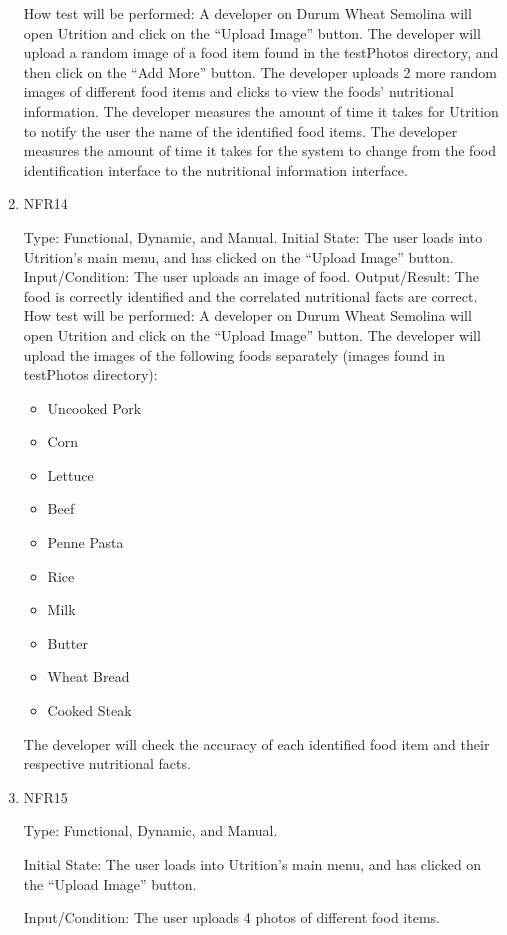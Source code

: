 \documentclass[12pt, titlepage]{article}
\begin{document}
\begin{enumerate}
How test will be performed: A developer on Durum Wheat Semolina will open Utrition and click on the “Upload Image” button. The developer will upload a random image of a food item found in the testPhotos directory, and then click on the “Add More” button. The developer uploads 2 more random images of different food items and clicks to view the foods’ nutritional information. The developer measures the amount of time it takes for Utrition to notify the user the name of the identified food items. The developer measures the amount of time it takes for the system to change from the food identification interface to the nutritional information interface.

\item{NFR14\\} 

Type: Functional, Dynamic, and Manual.
Initial State: The user loads into Utrition’s main menu, and has clicked on the “Upload Image” button.
Input/Condition: The user uploads an image of food.
Output/Result: The food is correctly identified and the correlated nutritional facts are correct.
How test will be performed: A developer on Durum Wheat Semolina will open Utrition and click on the “Upload Image” button. The developer will upload the images of the following foods separately (images found in testPhotos directory):
\begin{itemize}
	\item Uncooked Pork
	\item Corn
	\item Lettuce
	\item Beef
	\item Penne Pasta
	\item Rice
	\item Milk
	\item Butter
	\item Wheat Bread
	\item Cooked Steak
\end{itemize} 

The developer will check the accuracy of each identified food item and their respective nutritional facts.

\item{NFR15\\} 

Type: Functional, Dynamic, and Manual.

Initial State: The user loads into Utrition’s main menu, and has clicked on the “Upload Image” button.

Input/Condition: The user uploads 4 photos of different food items.


\end{enumerate}
\end{document}
